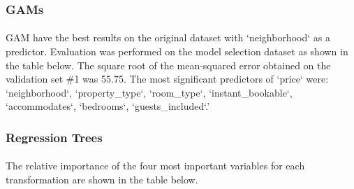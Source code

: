 \documentclass[11pt]{article}
\begin{document}
        \subsubsection{GAMs}
        	\paragraph{}
            GAM have the best results on the original dataset with `neighborhood` as a predictor. Evaluation was performed on the model selection dataset as shown in the table below. The square root of the mean-squared error obtained on the validation set \#1 was 55.75. The most significant predictors of `price` were: `neighborhood`, `property\_type`, `room\_type`, `instant\_bookable`, `accommodates`, `bedrooms`, `guests\_included`.'
           
		\begin{table}[H]
		\centering

			\label{my-label3}
\end{table}
        
        \subsubsection{Regression Trees}
        	\paragraph{}
            	The relative importance of the four most important variables for each transformation are shown in the table below.
            \begin{table}[H]
\centering

\label{my-label2}
\end{table}
            
\end{document}
